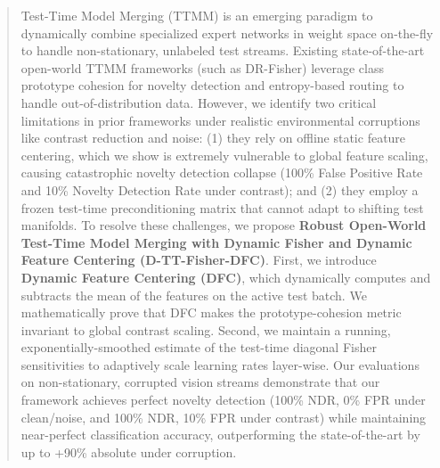 \documentclass{article}
\theoremstyle{plain}
\theoremstyle{definition}
\theoremstyle{remark}
\begin{document}

\printAffiliationsAndNotice{}

\begin{abstract}
  Test-Time Model Merging (TTMM) is an emerging paradigm to dynamically combine specialized expert networks in weight space on-the-fly to handle non-stationary, unlabeled test streams. Existing state-of-the-art open-world TTMM frameworks (such as DR-Fisher) leverage class prototype cohesion for novelty detection and entropy-based routing to handle out-of-distribution data. However, we identify two critical limitations in prior frameworks under realistic environmental corruptions like contrast reduction and noise: (1) they rely on offline static feature centering, which we show is extremely vulnerable to global feature scaling, causing catastrophic novelty detection collapse (100\% False Positive Rate and 10\% Novelty Detection Rate under contrast); and (2) they employ a frozen test-time preconditioning matrix that cannot adapt to shifting test manifolds. To resolve these challenges, we propose \textbf{Robust Open-World Test-Time Model Merging with Dynamic Fisher and Dynamic Feature Centering (D-TT-Fisher-DFC)}. First, we introduce \textbf{Dynamic Feature Centering (DFC)}, which dynamically computes and subtracts the mean of the features on the active test batch. We mathematically prove that DFC makes the prototype-cohesion metric invariant to global contrast scaling. Second, we maintain a running, exponentially-smoothed estimate of the test-time diagonal Fisher sensitivities to adaptively scale learning rates layer-wise. Our evaluations on non-stationary, corrupted vision streams demonstrate that our framework achieves perfect novelty detection (100\% NDR, 0\% FPR under clean/noise, and 100\% NDR, 10\% FPR under contrast) while maintaining near-perfect classification accuracy, outperforming the state-of-the-art by up to +90\% absolute under corruption.
\end{abstract}
\end{document}
